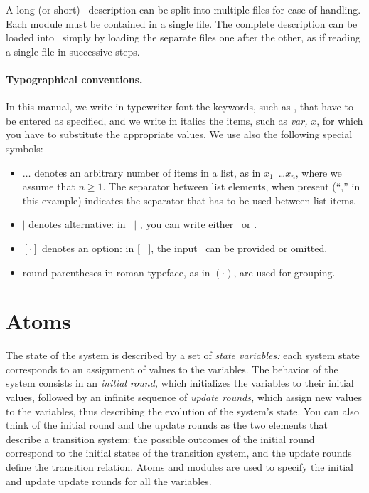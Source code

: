 A long (or short) \rem\ description can be split into multiple
files for ease of handling.  Each module must be
contained in a single file.  The complete description can be loaded
into \mocha\ simply by loading the separate files one after the other,
as if reading a single file in successive steps.

\paragraph{Typographical conventions.}

In this manual, we write in typewriter font the keywords, such as
\ATOM, that have to be entered as specified, and we write in italics
the items, such as {\it var,} $x$, for which you have to substitute
the appropriate values.  We use also the following special symbols: 
%
\begin{itemize}
  \item $\ldots$ denotes an arbitrary number of items in a list, as in
  $x_1$\COMA\ \ldots \COMA$x_n$, where we assume that $n \geq 1$.  The separator
  between list elements, when present (``,'' in this example)
  indicates the separator that has to be used between list 
  items.

  \item $|$ denotes alternative: in \TRUE\ $|$ \FALSE, you can write
  either \TRUE\ or \FALSE.

  \item $[\cdot]$ denotes an option: in [ \atomname\ ], the input
  \atomname\ can be provided or omitted.

  \item round parentheses in roman typeface, as in $( \cdot )$, are
  used for grouping. 
\end{itemize}
%


\section{Atoms}

The state of the system is described by a set of {\em state
variables:\/} each system state corresponds to an assignment of values
to the variables.  The behavior of the system consists in an {\em
initial round,} which initializes
the variables to their initial values, followed by an infinite
sequence of {\em update rounds,} which assign new
values to the variables, thus describing the evolution of the system's
state.  You can also think of the initial round and the update
rounds as the two elements that describe a transition system: the
possible outcomes of the initial round correspond to the
initial states of the transition system, and the update rounds define
the transition relation. Atoms and modules are used to specify the
initial and update update rounds for all the variables.


